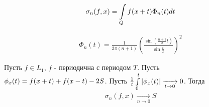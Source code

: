 \begin{definition}
	\begin{gather*}
		\sigma_n(f, x) = \int\limits_{Q} f(x + t)\Phi_n(t)dt
	\end{gather*}
\end{definition}

\begin{statement}
	\begin{gather*}
		\Phi_n(t) = 
		\frac{1}{2\pi(n + 1)}\left(\frac{\sin(\frac{n + 1}{2} t)}{\sin\frac{t}{2}} \right)^2
	\end{gather*}
\end{statement}

\begin{theorem}
	Пусть $f \in L_1$, $f$  - периодична с периодом $T$. 
	Пусть $\\ \phi_x(t) = f(x + t) + f(x - t) - 2S$.
	Пусть $\frac{1}{t} \int\limits_{0}^{t}\left|\phi_x(t)\right| \xrightarrow[t \rightarrow 0]{} 0$.
	Тогда 
	\begin{gather*}
		\sigma_n(f, x) \xrightarrow[n \rightarrow 0]{} S
	\end{gather*}
\end{theorem}

